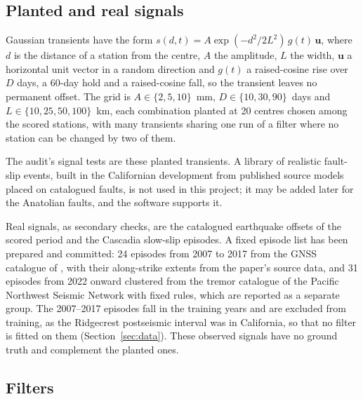 \documentclass[preprint,12pt,authoryear]{elsarticle}
\begin{document}
\subsection{Planted and real signals}
\label{sec:planted}

Gaussian transients have the form $s(d, t) = A \exp(-d^2 / 2L^2)\, g(t)\, \mathbf{u}$, where $d$ is the distance of a station from the centre, $A$ the amplitude, $L$ the width, $\mathbf{u}$ a horizontal unit vector in a random direction and $g(t)$ a raised-cosine rise over $D$ days, a 60-day hold and a raised-cosine fall, so the transient leaves no permanent offset. The grid is $A \in \{2, 5, 10\}$~mm, $D \in \{10, 30, 90\}$~days and $L \in \{10, 25, 50, 100\}$~km, each combination planted at 20 centres chosen among the scored stations, with many transients sharing one run of a filter where no station can be changed by two of them.

The audit's signal tests are these planted transients. A library of realistic fault-slip events, built in the Californian development from published source models placed on catalogued faults, is not used in this project; it may be added later for the Anatolian faults, and the software supports it.

Real signals, as secondary checks, are the catalogued earthquake offsets of the scored period and the Cascadia slow-slip episodes. A fixed episode list has been prepared and committed: 24 episodes from 2007 to 2017 from the GNSS catalogue of \citet{michel2019}, with their along-strike extents from the paper's source data, and 31 episodes from 2022 onward clustered from the tremor catalogue of the Pacific Northwest Seismic Network with fixed rules, which are reported as a separate group. The 2007--2017 episodes fall in the training years and are excluded from training, as the Ridgecrest postseismic interval was in California, so that no filter is fitted on them (Section~\ref{sec:data}). These observed signals have no ground truth and complement the planted ones.

\subsection{Filters}
\label{sec:filters}
\end{document}
